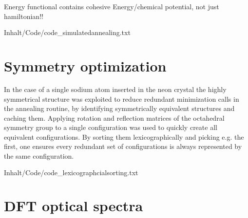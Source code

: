 Energy functional contains cohesive Energy/chemical potential, not just hamiltonian!!

{Inhalt/Code/code_simulatedannealing.txt}

\section{Symmetry optimization} 
In the case of a single sodium atom inserted in the neon crystal the highly symmetrical structure was exploited to reduce redundant minimization calls in the annealing routine, by identifying symmetrically equivalent structures and caching them. Applying rotation and reflection matrices of the octahedral symmetry group to a single configuration was used to quickly create all equivalent configurations. By sorting them lexicographically and picking e.g. the first, one ensures every redundant set of configurations is always represented by the same configuration.


{Inhalt/Code/code_lexicographcialsorting.txt} 

\section{DFT optical spectra}






%